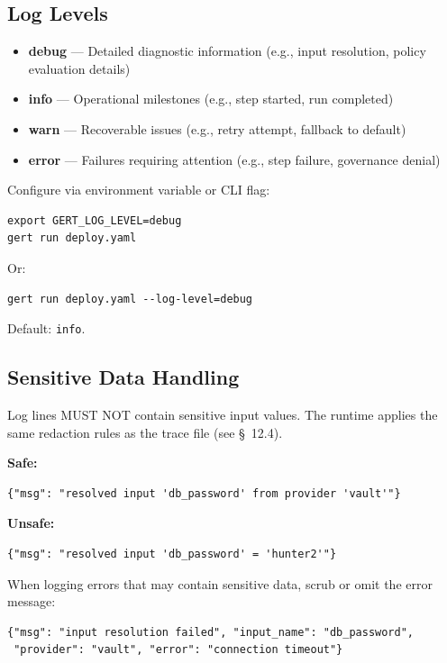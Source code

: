 \subsection{Log Levels}

\begin{itemize}
  \item \textbf{debug} — Detailed diagnostic information (e.g., input resolution, policy evaluation details)
  \item \textbf{info} — Operational milestones (e.g., step started, run completed)
  \item \textbf{warn} — Recoverable issues (e.g., retry attempt, fallback to default)
  \item \textbf{error} — Failures requiring attention (e.g., step failure, governance denial)
\end{itemize}

Configure via environment variable or CLI flag:

\begin{verbatim}
export GERT_LOG_LEVEL=debug
gert run deploy.yaml
\end{verbatim}

Or:

\begin{verbatim}
gert run deploy.yaml --log-level=debug
\end{verbatim}

Default: \texttt{info}.

\subsection{Sensitive Data Handling}

Log lines MUST NOT contain sensitive input values. The runtime applies the same redaction rules as the trace file (see \S~12.4).

\textbf{Safe:}
\begin{verbatim}
{"msg": "resolved input 'db_password' from provider 'vault'"}
\end{verbatim}

\textbf{Unsafe:}
\begin{verbatim}
{"msg": "resolved input 'db_password' = 'hunter2'"}
\end{verbatim}

When logging errors that may contain sensitive data, scrub or omit the error message:

\begin{verbatim}
{"msg": "input resolution failed", "input_name": "db_password", 
 "provider": "vault", "error": "connection timeout"}
\end{verbatim}

